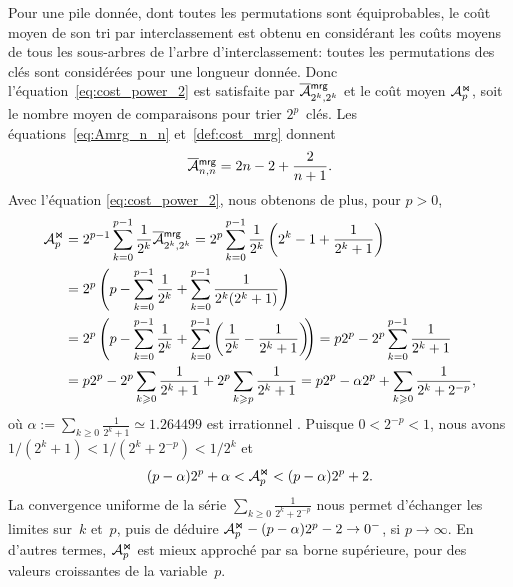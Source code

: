Pour une pile donnée, dont toutes les permutations sont équiprobables,
le coût moyen de son tri par interclassement est obtenu en considérant
les coûts moyens de tous les sous-arbres de l'arbre d'interclassement:
toutes les permutations des clés sont considérées pour une longueur
donnée. Donc l'équation~\eqref{eq:cost_power_2} est satisfaite par
\(\OM{\fun{mrg}}{2^k,2^k}\) et le coût moyen
\(\mathcal{A}_{p}^{\Join}\), soit le nombre moyen de
comparaisons pour trier \(2^p\)~clés. Les
équations~\eqref{eq:Amrg_n_n} et~\eqref{def:cost_mrg} donnent
\begin{equation*}
\OM{\fun{mrg}}{n,n} = 2n - 2 + \frac{2}{n+1}.
\index{mrg@$\OM{\fun{mrg}}{n,n}$}
\end{equation*}
Avec l'équation \eqref{eq:cost_power_2}, nous obtenons de plus, pour
\(p > 0\),
\begin{align}
\M{\Join}{p}
  &= 2^{p-1}\sum_{k=0}^{p-1}{\frac{1}{2^k}\OM{\fun{mrg}}{2^k,2^k}}
  = 2^p\sum_{k=0}^{p-1}{\frac{1}{2^k}\left(2^k - 1 + \frac{1}{2^k +
      1}\right)}\notag\\
  &= 2^{p}\left(p - \sum_{k=0}^{p-1}{\frac{1}{2^k}}
     + \sum_{k=0}^{p-1}{\frac{1}{2^k(2^k+1)}}\right)\notag\\
  &= 2^{p}\left(p - \sum_{k=0}^{p-1}{\frac{1}{2^k}}
     + \sum_{k=0}^{p-1}\left(\frac{1}{2^k}
     - \frac{1}{2^k+1}\right)\!\!\right)
   = p2^p - 2^p \sum_{k=0}^{p-1}\frac{1}{2^k+1}\notag\\
  &= p2^p - 2^p \sum_{k \geqslant 0}\frac{1}{2^k+1}
     + 2^p \sum_{k \geqslant p}\frac{1}{2^k+1}
= p2^p - \alpha 2^p + \sum_{k \geqslant 0}\frac{1}{2^{k}+2^{-p}},
\label{eq:Mjoin}
\end{align}
où \(\alpha := \sum_{k \geqslant 0}\frac{1}{2^k+1} \simeq 1.264499\)
est irrationnel \citep{Borwein_1992}. Puisque \(0 < 2^{-p} < 1\), nous
avons \(1/(2^k + 1) < 1/(2^k+2^{-p}) < 1/2^k\) et
\begin{equation}
(p - \alpha)2^p + \alpha < \mathcal{A}_{p}^{\Join} < (p-\alpha)2^p + 2.
\label{ineq:M_join}
\end{equation}
La convergence uniforme de la série \(\sum_{k \geqslant
  0}\frac{1}{2^{k}+2^{-p}}\) nous permet d'échanger les limites
sur~\(k\) et~\(p\), puis de déduire \(\mathcal{A}_{p}^{\Join} - (p-\alpha)2^p - 2
\rightarrow 0^{-}\), si \(p \rightarrow \infty\). En d'autres termes,
\(\mathcal{A}_{p}^{\Join}\) est mieux approché par sa borne supérieure, pour des
valeurs croissantes de la variable~\(p\).


